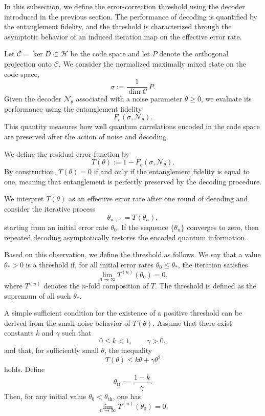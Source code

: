 \documentclass[12pt]{article}
\theoremstyle{definition} %
\theoremstyle{plain} %
\theoremstyle{remark} %
\theoremstyle{underline}
\begin{document}
In this subsection, we define the error-correction threshold using the decoder introduced in the previous section.
The performance of decoding is quantified by the entanglement fidelity, and the threshold is characterized through the asymptotic behavior of an induced iteration map on the effective error rate.

Let $\mathcal{C}=\ker D\subset\mathcal{H}$ be the code space and let $P$ denote the orthogonal projection onto $\mathcal{C}$.
We consider the normalized maximally mixed state on the code space,
\[
    \sigma := \frac{1}{\dim\mathcal{C}}\,P.
\]
Given the decoder $\mathcal{N}_\theta$ associated with a noise parameter $\theta\ge 0$, we evaluate its performance using the entanglement fidelity
\[
    F_e(\sigma,\mathcal{N}_\theta).
\]
This quantity measures how well quantum correlations encoded in the code space are preserved after the action of noise and decoding.

We define the residual error function by
\[
    T(\theta) := 1 - F_e(\sigma,\mathcal{N}_\theta).
\]
By construction, $T(\theta)=0$ if and only if the entanglement fidelity is equal to one, meaning that entanglement is perfectly preserved by the decoding procedure.

We interpret $T(\theta)$ as an effective error rate after one round of decoding and consider the iterative process
\[
    \theta_{n+1} = T(\theta_n),
\]
starting from an initial error rate $\theta_0$.
If the sequence $\{\theta_n\}$ converges to zero, then repeated decoding asymptotically restores the encoded quantum information.

Based on this observation, we define the threshold as follows.
We say that a value $\theta_\ast>0$ is a threshold if, for all initial error rates $\theta_0\le\theta_\ast$, the iteration satisfies
\[
    \lim_{n\to\infty} T^{(n)}(\theta_0)=0,
\]
where $T^{(n)}$ denotes the $n$-fold composition of $T$.
The threshold is defined as the supremum of all such $\theta_\ast$.

A simple sufficient condition for the existence of a positive threshold can be derived from the small-noise behavior of $T(\theta)$.
Assume that there exist constants $k$ and $\gamma$ such that
\[
    0\le k<1,\qquad \gamma>0,
\]
and that, for sufficiently small $\theta$, the inequality
\[
    T(\theta)\le k\theta+\gamma\theta^2
\]
holds.
Define
\[
    \theta_{\mathrm{th}} := \frac{1-k}{\gamma}.
\]
Then, for any initial value $\theta_0<\theta_{\mathrm{th}}$, one has
\[
    \lim_{n\to\infty} T^{(n)}(\theta_0)=0.
\]
\end{document}
